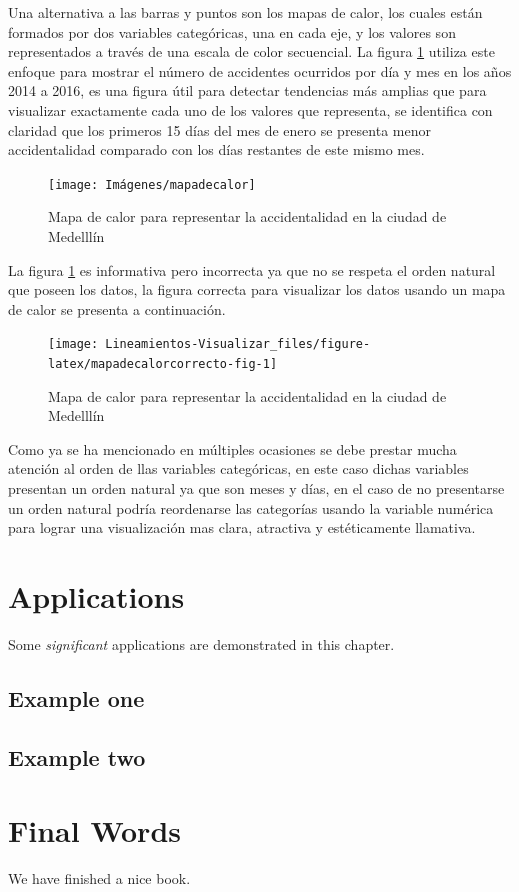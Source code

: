 \documentclass[
]{book}
\begin{document}
Una alternativa a las barras y puntos son los mapas de calor, los cuales están formados por dos variables categóricas, una en cada eje, y los valores son representados a través de una escala de color secuencial. La figura \ref{fig:mapadecalor-fig} utiliza este enfoque para mostrar el número de accidentes ocurridos por día y mes en los años 2014 a 2016, es una figura útil para detectar tendencias más amplias que para visualizar exactamente cada uno de los valores que representa, se identifica con claridad que los primeros 15 días del mes de enero se presenta menor accidentalidad comparado con los días restantes de este mismo mes.

\begin{figure}

{\centering \texttt{[image: Imágenes/mapadecalor]} 

}

\caption{Mapa de calor para representar la accidentalidad en la ciudad de Medelllín}\label{fig:mapadecalor-fig}
\end{figure}

La figura \ref{fig:mapadecalor-fig} es informativa pero incorrecta ya que no se respeta el orden natural que poseen los datos, la figura correcta para visualizar los datos usando un mapa de calor se presenta a continuación.

\begin{figure}

{\centering \texttt{[image: Lineamientos-Visualizar\_files/figure-latex/mapadecalorcorrecto-fig-1]} 

}

\caption{Mapa de calor para representar la accidentalidad en la ciudad de Medelllín}\label{fig:mapadecalorcorrecto-fig}
\end{figure}

Como ya se ha mencionado en múltiples ocasiones se debe prestar mucha atención al orden de llas variables categóricas, en este caso dichas variables presentan un orden natural ya que son meses y días, en el caso de no presentarse un orden natural podría reordenarse las categorías usando la variable numérica para lograr una visualización mas clara, atractiva y estéticamente llamativa.

\hypertarget{applications}{%
\chapter{Applications}\label{applications}}

Some \emph{significant} applications are demonstrated in this chapter.

\hypertarget{example-one}{%
\section{Example one}\label{example-one}}

\hypertarget{example-two}{%
\section{Example two}\label{example-two}}

\hypertarget{final-words}{%
\chapter{Final Words}\label{final-words}}

We have finished a nice book.

  
\end{document}
